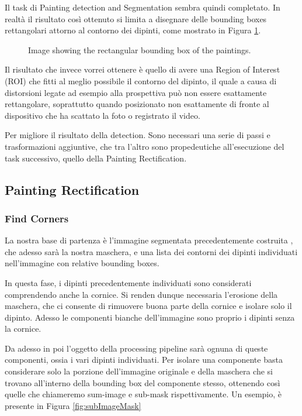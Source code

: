 \documentclass[10pt,twocolumn,letterpaper]{article}
\begin{document}
Il task di Painting detection and Segmentation sembra quindi completato. In realtà il risultato così ottenuto si limita a disegnare delle bounding boxes rettangolari attorno al contorno dei dipinti, come mostrato in Figura \ref{fig:imageRectROI}.

\begin{figure}[t]
   \begin{center}
   \fbox{\rule{0pt}{2in} \rule{0.9\linewidth}{0pt}}
   \end{center}
      \caption{Image showing the rectangular bounding box of the paintings.}
   \label{fig:imageRectROI}
\end{figure}

Il risultato che invece vorrei ottenere è quello di avere una Region of Interest (ROI) che fitti al meglio possibile il contorno del dipinto, il quale a causa di distorsioni legate ad esempio alla prospettiva può non essere esattamente rettangolare, soprattutto quando posizionato non esattamente di fronte al dispositivo che ha scattato la foto o registrato il video.

Per migliore il risultato della detection. Sono necessari una serie di passi e trasformazioni aggiuntive, che tra l'altro sono propedeutiche all'esecuzione del task successivo, quello della Painting Rectification.

\subsection{Painting Rectification}

\subsubsection{Find Corners}

La nostra base di partenza è l'immagine segmentata precedentemente costruita , che adesso sarà la nostra maschera, e una lista dei contorni dei dipinti individuati nell'immagine con relative bounding boxes.

In questa fase, i dipinti precedentemente individuati sono considerati comprendendo anche la cornice. Si renden dunque necessaria l'erosione della maschera, che ci consente di rimuovere buona parte della cornice e isolare solo il dipinto. Adesso le componenti bianche dell'immagine sono proprio i dipinti senza la cornice.

Da adesso in poi l'oggetto della processing pipeline sarà ognuna di queste componenti, ossia i vari dipinti individuati. Per isolare una componente basta considerare solo la porzione dell'immagine originale e della maschera che si trovano all'interno della bounding box del componente stesso, ottenendo così quelle che chiameremo sum-image e sub-mask rispettivamente. Un esempio, è presente in Figura \ref{fig:subImageMask}
\end{document}
